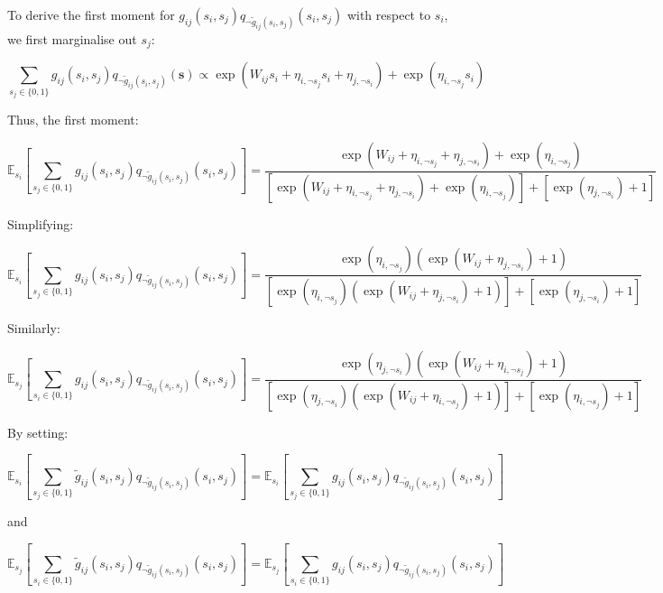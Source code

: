 \documentclass[12pt]{article}
\begin{document}
To derive the first moment for $ g_{ij}(s_i, s_j) q_{\neg \tilde{g}_{ij}(s_i, s_j)}(s_i, s_j)$ with respect to $s_i$, we first marginalise out $s_j$:

\[ \sum_{s_j \in \{0, 1\}} g_{ij}(s_i, s_j) q_{\neg \tilde{g}_{ij}(s_i, s_j)}(\textbf{s}) \propto \exp\left( W_{ij} s_i + \eta_{i, \neg s_j} s_i + \eta_{j, \neg s_i}\right) +  \exp\left(\eta_{i, \neg s_j} s_i \right)
\]

Thus, the first moment:

\[\mathbb{E}_{s_i}\left[\sum_{s_j \in \{0, 1\}}g_{ij}(s_i, s_j) q_{\neg \tilde{g}_{ij}(s_i, s_j)}(s_i, s_j)\right] = \frac{\exp\left( W_{ij} + \eta_{i, \neg s_j}  + \eta_{j, \neg s_i}\right) +  \exp\left(\eta_{i, \neg s_j}\right)}{\left[\exp\left( W_{ij} + \eta_{i, \neg s_j}  + \eta_{j, \neg s_i}\right) +  \exp\left(\eta_{i, \neg s_j}\right)\right]+\left[\exp\left( \eta_{j, \neg s_i}\right) +  1\right]}\]

Simplifying:

\[\mathbb{E}_{s_i}\left[\sum_{s_j \in \{0, 1\}}g_{ij}(s_i, s_j) q_{\neg \tilde{g}_{ij}(s_i, s_j)}(s_i, s_j)\right] = \frac{\exp\left(\eta_{i, \neg s_j}\right)\left(\exp\left( W_{ij}  + \eta_{j, \neg s_i}\right) + 1\right)  }{\left[\exp\left(\eta_{i, \neg s_j}\right)\left(\exp\left( W_{ij}  + \eta_{j, \neg s_i}\right) + 1\right)  \right]+\left[\exp\left( \eta_{j, \neg s_i}\right) +  1\right]}\]

Similarly:

\[\mathbb{E}_{s_j}\left[\sum_{s_i \in \{0, 1\}}g_{ij}(s_i, s_j) q_{\neg \tilde{g}_{ij}(s_i, s_j)}(s_i, s_j)\right] = \frac{\exp\left(\eta_{j, \neg s_i}\right)\left(\exp\left( W_{ij}  + \eta_{i, \neg s_j}\right) + 1\right)  }{\left[\exp\left(\eta_{j, \neg s_i}\right)\left(\exp\left( W_{ij}  + \eta_{i, \neg s_j}\right) + 1\right) \right]+\left[\exp\left( \eta_{i, \neg s_j}\right) +  1\right]}\]


By setting:

\[\mathbb{E}_{s_i}\left[\sum_{s_j \in \{0, 1\}}\tilde{g}_{ij}(s_i, s_j) q_{\neg \tilde{g}_{ij}(s_i, s_j)}(s_i, s_j)\right] = \mathbb{E}_{s_i}\left[\sum_{s_j \in \{0, 1\}}g_{ij}(s_i, s_j) q_{\neg \tilde{g}_{ij}(s_i, s_j)}(s_i, s_j)\right]\]


and

\[\mathbb{E}_{s_j}\left[\sum_{s_i \in \{0, 1\}}\tilde{g}_{ij}(s_i, s_j) q_{\neg \tilde{g}_{ij}(s_i, s_j)}(s_i, s_j)\right] = \mathbb{E}_{s_j}\left[\sum_{s_i \in \{0, 1\}}g_{ij}(s_i, s_j) q_{\neg \tilde{g}_{ij}(s_i, s_j)}(s_i, s_j)\right]\]
\end{document}
